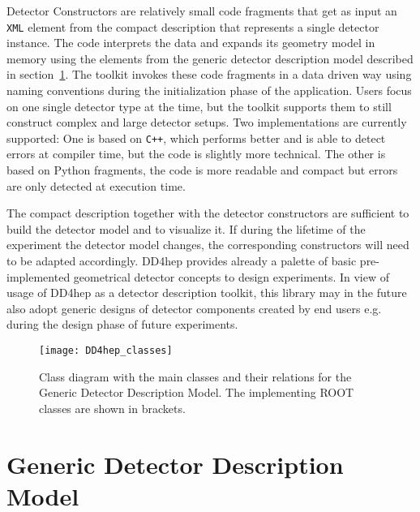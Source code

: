 Detector Constructors are relatively small code fragments that get as input an \texttt{XML} element from the compact description that represents  a single detector instance. The code interprets the data and expands  its geometry model in memory using the elements from the generic detector description model described in section~\ref{subsec:generic-model}. The toolkit invokes these code fragments in a data driven way using naming conventions during the initialization phase of the  application. Users focus on one single detector type at the time, but the toolkit supports them to still construct complex and large detector setups. Two implementations are currently supported: One is based on \texttt{C++}, which performs better and is able to detect errors at compiler time, but the code is slightly more technical. The other is based on Python fragments, the code is more readable and compact but errors are only detected at execution time.


The compact description together with the detector constructors are sufficient to build the detector model and to visualize it. If during the lifetime of the experiment the detector model changes, the corresponding constructors will need to be adapted accordingly. DD4hep provides already a palette of basic pre-implemented geometrical detector concepts to design experiments. In view of usage of DD4hep as a detector  description toolkit, this library may in the future also adopt generic designs of detector components created by end users e.g. during the design  phase of future experiments.

\begin{figure}[t]
  \begin{center}
    \texttt{[image: DD4hep\_classes]}
    \caption{Class diagram with the main classes and their relations 
             for the Generic Detector Description Model. The implementing
             ROOT classes are shown in brackets.}
    \label{fig:dd4hep-detector-model}
  \end{center}
\end{figure}


\section{Generic Detector Description Model}
\label{subsec:generic-model}

